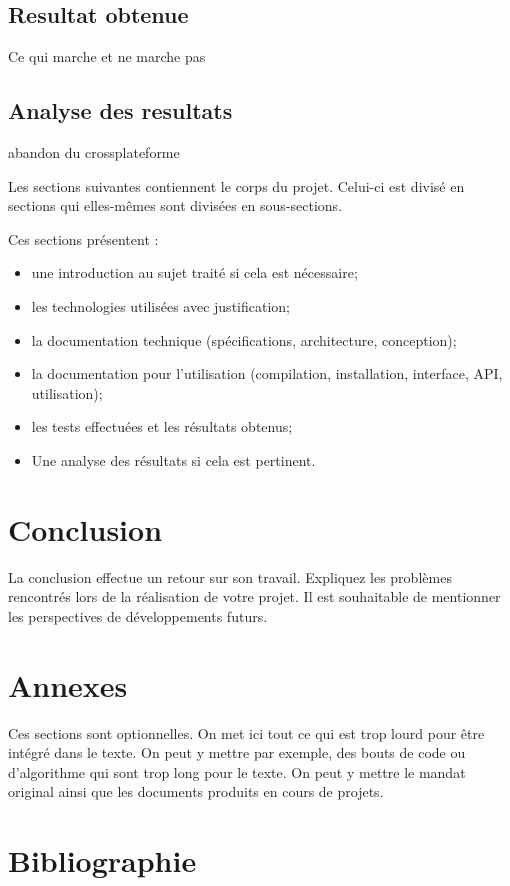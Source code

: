 \documentclass[12pt,fleqn]{article}
\begin{document}
\subsection{Resultat obtenue}
Ce qui marche et ne marche pas 

\subsection{Analyse des resultats}
abandon du crossplateforme


Les sections suivantes contiennent le corps du projet. Celui-ci est divisé en sections qui elles-mêmes sont divisées
en sous-sections.


Ces sections présentent :

\begin{itemize}
\item une introduction au sujet traité si cela est nécessaire;
\item les technologies utilisées avec justification;
\item la documentation technique (spécifications, architecture, conception);
\item la documentation pour l'utilisation (compilation, installation, interface, API, utilisation);
\item les tests effectuées et les résultats obtenus;
\item Une analyse des résultats si cela est pertinent.
\end{itemize}



\section{Conclusion}

La conclusion effectue un retour sur son travail. Expliquez les problèmes rencontrés lors de la réalisation de votre projet. Il est souhaitable de mentionner les perspectives de développements futurs.

\section{Annexes}

Ces sections sont optionnelles.  On met ici tout ce qui est trop lourd pour être intégré dans le texte.  On peut y mettre par exemple, des bouts de code ou d'algorithme qui sont trop long pour le texte. On peut y mettre le mandat original ainsi que les documents produits en cours de projets.


\section{Bibliographie}
\vspace{-0.75cm}
\renewcommand\refname{}



\nocite{*}
\end{document}
